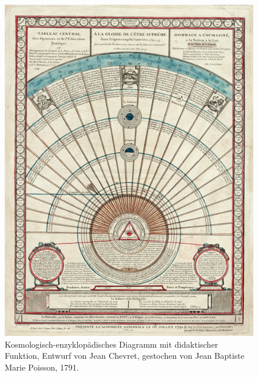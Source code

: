 \begin{figure}[htbp]
\centering
\includegraphics{img/wagner-9.jpg}
\caption{Kosmologisch-enzyklopädisches Diagramm mit didaktischer
Funktion, Entwurf von Jean Chevret, gestochen von Jean Baptiste Marie
Poisson, 1791.}
\end{figure}

